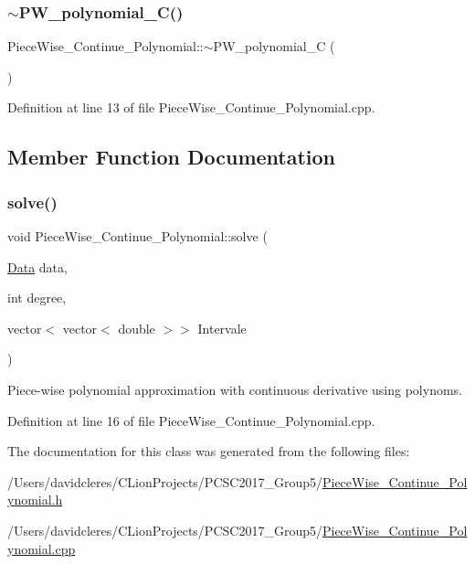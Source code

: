 \subsubsection{\texorpdfstring{$\sim$\+P\+W\+\_\+polynomial\+\_\+\+C()}{~PW\_polynomial\_C()}}
{\footnotesize\ttfamily Piece\+Wise\+\_\+\+Continue\+\_\+\+Polynomial\+::$\sim$\+P\+W\+\_\+polynomial\+\_\+C (\begin{DoxyParamCaption}{ }\end{DoxyParamCaption})}



Definition at line 13 of file Piece\+Wise\+\_\+\+Continue\+\_\+\+Polynomial.\+cpp.



\subsection{Member Function Documentation}
\mbox{\label{class_piece_wise___continue___polynomial_af658537a378050635a735bbc0d7684e8}} 
\subsubsection{\texorpdfstring{solve()}{solve()}}
{\footnotesize\ttfamily void Piece\+Wise\+\_\+\+Continue\+\_\+\+Polynomial\+::solve (\begin{DoxyParamCaption}\item[{\mbox{\hyperlink{struct_data}{Data}}}]{data,  }\item[{int}]{degree,  }\item[{vector$<$ vector$<$ double $>$$>$}]{Intervale }\end{DoxyParamCaption})}



Piece-\/wise polynomial approximation with continuous derivative using polynoms. 



Definition at line 16 of file Piece\+Wise\+\_\+\+Continue\+\_\+\+Polynomial.\+cpp.



The documentation for this class was generated from the following files\+:\begin{DoxyCompactItemize}
\item 
/\+Users/davidcleres/\+C\+Lion\+Projects/\+P\+C\+S\+C2017\+\_\+\+Group5/\mbox{\hyperlink{_piece_wise___continue___polynomial_8h}{Piece\+Wise\+\_\+\+Continue\+\_\+\+Polynomial.\+h}}\item 
/\+Users/davidcleres/\+C\+Lion\+Projects/\+P\+C\+S\+C2017\+\_\+\+Group5/\mbox{\hyperlink{_piece_wise___continue___polynomial_8cpp}{Piece\+Wise\+\_\+\+Continue\+\_\+\+Polynomial.\+cpp}}\end{DoxyCompactItemize}
